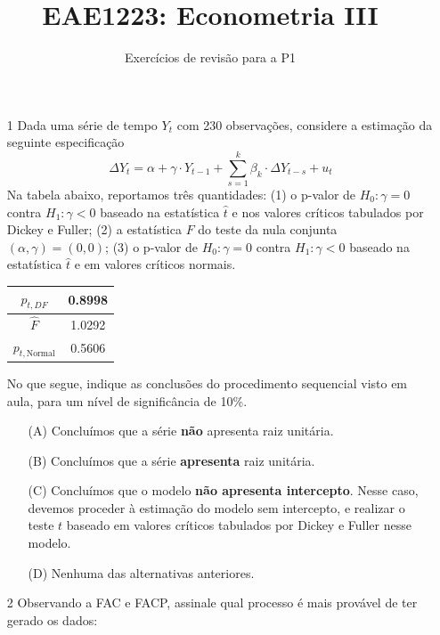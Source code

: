 \documentclass[10pt,a4paper]{article}
\title{\large EAE1223: Econometria III}
\author{\normalsize Exercícios de revisão para a P1}
\date{}
\begin{document}
	\maketitle
\begin{enumerate}
	
	\item[1] Dada uma série de tempo $Y_t$ com 230 observações, considere a estimação da seguinte especificação
	\begin{equation}
		\Delta Y_t = \alpha + \gamma \cdot Y_{t-1} + \sum_{s=1}^k \beta_k \cdot \Delta Y_{t-s} + u_t
	\end{equation}
	Na tabela abaixo, reportamos três quantidades: (1) o p-valor de $H_0: \gamma = 0$ contra $H_1: \gamma < 0$ baseado na estatística $\hat{t}$ e nos valores críticos tabulados por Dickey e Fuller; (2) a estatística $F$ do teste da nula conjunta $(\alpha, \gamma) = (0,0)$; (3) o p-valor de $H_0: \gamma = 0$ contra $H_1: \gamma < 0$ baseado na estatística $\hat{t}$ e em valores críticos normais.
	
	
	\begin{table}[H]
		\begin{center}
			\begin{tabular}{c|c}
				
				$p_{t,DF}$&0.8998    \\
				\hline
				$\hat{F}$&1.0292    \\
				\hline
				$p_{t,\text{Normal}}$&0.5606\\
			\end{tabular}
		\end{center}
	\end{table}
	No que segue, indique as conclusões do procedimento sequencial visto em aula, para um nível de significância de 10\%.
	\begin{enumerate}
		\item[(A)] Concluímos que a série \textbf{não} apresenta raiz unitária.
		\item[(B)] Concluímos que a série \textbf{apresenta} raiz unitária.
		\item[(C)] Concluímos que o modelo \textbf{não apresenta intercepto}. Nesse caso, devemos proceder à estimação do modelo sem intercepto, e realizar o teste $t$ baseado em valores críticos tabulados por Dickey e Fuller nesse modelo.
		\item[(D)] Nenhuma das alternativas anteriores.
	\end{enumerate}
	
	\item[2] Observando a FAC e FACP, assinale qual processo é mais provável de ter gerado os dados:
	

\end{enumerate}
\end{document}
